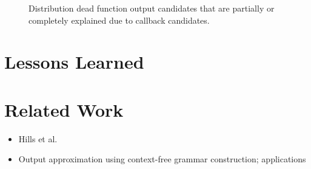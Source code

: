 \documentclass[preprint]{sig-alternate-05-2015}
\begin{document}
\begin{figure}[p]
	
	\caption{Distribution dead function output candidates that are partially or
	completely explained due to callback candidates.}
	\label{fig:output_candidate_explanation}
\end{figure}



\section{Lessons Learned}

\section{Related Work}
\begin{itemize}
	\item Hills et al. \cite{Hills:2013:ESP:2483760.2483786}
	\item Output approximation using context-free grammar construction; applications \cite{minamide2005static,wassermann2007sound}
\end{itemize}



\end{document}
